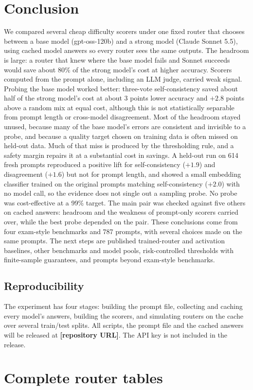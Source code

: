 \documentclass[11pt]{article}
\begin{document}
\FloatBarrier
\section{Conclusion}
We compared several cheap difficulty scorers under one fixed router that chooses between a base model (gpt-oss-120b) and a strong model (Claude Sonnet 5.5), using cached model answers so every router sees the same outputs. The headroom is large: a router that knew where the base model fails and Sonnet succeeds would save about 80\% of the strong model's cost at higher accuracy. Scorers computed from the prompt alone, including an LLM judge, carried weak signal. Probing the base model worked better: three-vote self-consistency saved about half of the strong model's cost at about 3 points lower accuracy and $+2.8$ points above a random mix at equal cost, although this is not statistically separable from prompt length or cross-model disagreement. Most of the headroom stayed unused, because many of the base model's errors are consistent and invisible to a probe, and because a quality target chosen on training data is often missed on held-out data. Much of that miss is produced by the thresholding rule, and a safety margin repairs it at a substantial cost in savings. A held-out run on 614 fresh prompts reproduced a positive lift for self-consistency ($+1.9$) and disagreement ($+1.6$) but not for prompt length, and showed a small embedding classifier trained on the original prompts matching self-consistency ($+2.0$) with no model call, so the evidence does not single out a sampling probe. No probe was cost-effective at a 99\% target. The main pair was checked against five others on cached answers: headroom and the weakness of prompt-only scorers carried over, while the best probe depended on the pair. These conclusions come from four exam-style benchmarks and 787 prompts, with several choices made on the same prompts. The next steps are published trained-router and activation baselines, other benchmarks and model pools, risk-controlled thresholds with finite-sample guarantees, and prompts beyond exam-style benchmarks.

\subsection*{Reproducibility}
The experiment has four stages: building the prompt file, collecting and caching every model's answers, building the scorers, and simulating routers on the cache over several train/test splits. All scripts, the prompt file and the cached answers will be released at \textbf{[repository URL]}. The API key is not included in the release.

\appendix
\section{Complete router tables}\label{app:all}




\FloatBarrier


\FloatBarrier



\end{document}
